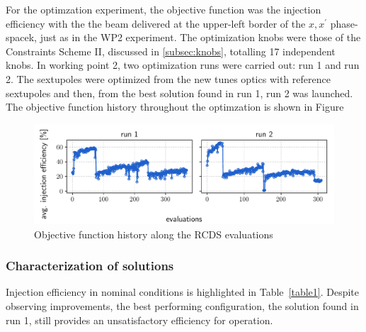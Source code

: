 For the optimzation experiment, the objective function was the injection efficiency with the the beam delivered at the upper-left border of the $x,x^\prime$ phase-spacek, just as in the WP2 experiment. The optimization knobs were those of the Constraints Scheme II, discussed in \ref{subsec:knobs}, totalling 17 independent knobs. In working point 2, two optimization runs were carried out: run 1 and run 2. The sextupoles were optimized from the new tunes optics with reference sextupoles and then, from the best solution found in run 1, run 2 was launched. The objective function history throughout the optimzation is shown in Figure
\begin{figure}
    \includegraphics[width=\columnwidth]{Images/wp2_objfunc_hist.pdf}
    \caption{Objective function history along the RCDS evaluations}
\end{figure}
\subsubsection{Characterization of solutions}
Injection efficiency in nominal conditions is highlighted in Table~\ref{table1}. Despite observing improvements, the best performing configuration, the solution found in run 1, still provides an unsatisfactory efficiency for operation.


